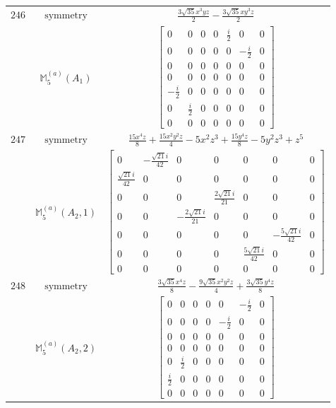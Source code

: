 \documentclass[fleqn,8pt,landscape]{jsarticle}
\begin{document}
\begin{longtable}{ccc}
$ 246 $ & $ \text{symmetry} $ & $ \frac{3 \sqrt{35} x^{3} y z}{2} - \frac{3 \sqrt{35} x y^{3} z}{2} $ \\
$  $ & $ \mathbb{M}_{5}^{(a)}(A_{1}) $ & $ \begin{bmatrix} 0 & 0 & 0 & 0 & \frac{i}{2} & 0 & 0 \\ 0 & 0 & 0 & 0 & 0 & - \frac{i}{2} & 0 \\ 0 & 0 & 0 & 0 & 0 & 0 & 0 \\ 0 & 0 & 0 & 0 & 0 & 0 & 0 \\ - \frac{i}{2} & 0 & 0 & 0 & 0 & 0 & 0 \\ 0 & \frac{i}{2} & 0 & 0 & 0 & 0 & 0 \\ 0 & 0 & 0 & 0 & 0 & 0 & 0 \end{bmatrix} $ \\ \hline
$ 247 $ & $ \text{symmetry} $ & $ \frac{15 x^{4} z}{8} + \frac{15 x^{2} y^{2} z}{4} - 5 x^{2} z^{3} + \frac{15 y^{4} z}{8} - 5 y^{2} z^{3} + z^{5} $ \\
$  $ & $ \mathbb{M}_{5}^{(a)}(A_{2},1) $ & $ \begin{bmatrix} 0 & - \frac{\sqrt{21} i}{42} & 0 & 0 & 0 & 0 & 0 \\ \frac{\sqrt{21} i}{42} & 0 & 0 & 0 & 0 & 0 & 0 \\ 0 & 0 & 0 & \frac{2 \sqrt{21} i}{21} & 0 & 0 & 0 \\ 0 & 0 & - \frac{2 \sqrt{21} i}{21} & 0 & 0 & 0 & 0 \\ 0 & 0 & 0 & 0 & 0 & - \frac{5 \sqrt{21} i}{42} & 0 \\ 0 & 0 & 0 & 0 & \frac{5 \sqrt{21} i}{42} & 0 & 0 \\ 0 & 0 & 0 & 0 & 0 & 0 & 0 \end{bmatrix} $ \\ \hline
$ 248 $ & $ \text{symmetry} $ & $ \frac{3 \sqrt{35} x^{4} z}{8} - \frac{9 \sqrt{35} x^{2} y^{2} z}{4} + \frac{3 \sqrt{35} y^{4} z}{8} $ \\
$  $ & $ \mathbb{M}_{5}^{(a)}(A_{2},2) $ & $ \begin{bmatrix} 0 & 0 & 0 & 0 & 0 & - \frac{i}{2} & 0 \\ 0 & 0 & 0 & 0 & - \frac{i}{2} & 0 & 0 \\ 0 & 0 & 0 & 0 & 0 & 0 & 0 \\ 0 & 0 & 0 & 0 & 0 & 0 & 0 \\ 0 & \frac{i}{2} & 0 & 0 & 0 & 0 & 0 \\ \frac{i}{2} & 0 & 0 & 0 & 0 & 0 & 0 \\ 0 & 0 & 0 & 0 & 0 & 0 & 0 \end{bmatrix} $ \\ \hline

\end{longtable}
\end{document}
